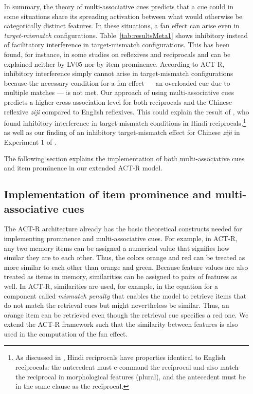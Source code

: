 \documentclass{cambridge7A}\usepackage[]{graphicx}\usepackage[]{color}
\begin{document}
In summary, the theory of multi-associative cues predicts that a cue could in some situations share its spreading activation between what would otherwise be categorically distinct features. In these situations, a fan effect can arise even in \emph{target-mismatch} configurations. 
Table~\ref{tab:resultsMeta1} shows inhibitory instead of facilitatory interference in target-mismatch configurations. This has been found, for instance, in some studies on reflexives and reciprocals and can be explained neither by LV05 nor by item prominence. 
According to ACT-R, inhibitory interference simply cannot arise in target-mismatch configurations because the necessary condition for a fan effect --- an overloaded cue due to multiple matches --- is not met. Our approach of using  multi-associative cues predicts a higher cross-association level for both reciprocals and the Chinese reflexive  \textit{ziji} compared to English reflexives. This could explain the result of \cite{KushPhillips2014}, who found inhibitory interference in target-mismatch conditions in Hindi reciprocals,\footnote{As discussed in \cite{KushPhillips2014}, Hindi reciprocals have properties identical to English reciprocals: the antecedent must c-command the reciprocal and also match the reciprocal in morphological features (plural), and the antecedent must be in the same clause as the reciprocal.} 
as well as our finding of an inhibitory target-mismatch effect for Chinese \textit{ziji} in Experiment 1 of \cite{JaegerEngelmannVasishth2015}.

The following section explains the implementation of both multi-associative cues and item prominence in our extended ACT-R model.

\subsection{Implementation of item prominence and multi-associative cues}
\label{sec:impl}

The ACT-R architecture already has the basic theoretical constructs needed for implementing  prominence and  multi-associative cues.
For example, in ACT-R, any two memory items can be assigned a numerical value that signifies how similar they are to each other. Thus, the colors orange and red can be treated as more similar to each other than orange and green. Because feature values  are also treated as items in memory, similarities can be assigned to pairs of features as well.
In ACT-R, similarities are used, for example, in the equation for a component called  \emph{mismatch penalty} that enables the model to retrieve items that do not match the retrieval cues but might nevertheless be similar. Thus, an orange item can be retrieved even though the retrieval cue specifies a red one.
We extend the ACT-R framework such that the similarity between features is also used in the computation of the fan effect. 
\end{document}
